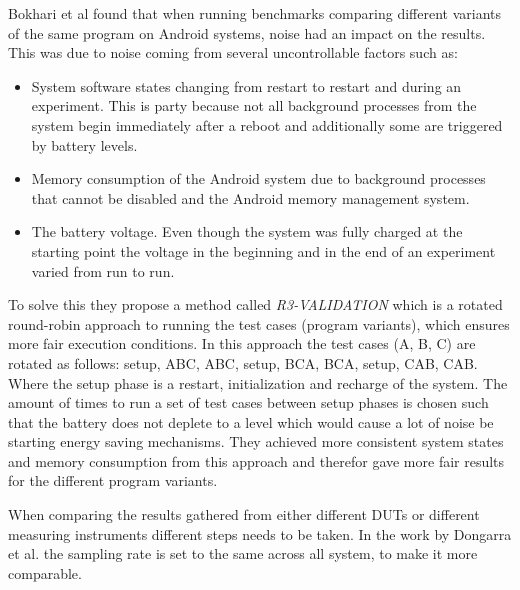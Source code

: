 Bokhari et al\cite{Bokhari2020r3} found that when running benchmarks comparing different variants of the same program on Android systems, noise had an impact on the results. This was due to noise coming from several uncontrollable factors such as:\cite*{Bokhari2020r3}

\begin{itemize}
    \item System software states changing from restart to restart and during an experiment. This is party because not all background processes from the system begin immediately after a reboot and additionally some are triggered by battery levels.
    \item Memory consumption of the Android system due to background processes that cannot be disabled and the Android memory management system.
    \item The battery voltage. Even though the system was fully charged at the starting point the voltage in the beginning and in the end of an experiment varied from run to run.
\end{itemize}

To solve this they propose a method called \textit{R3-VALIDATION}\cite*{Bokhari2020r3} which is a rotated round-robin approach to running the test cases (program variants), which ensures more fair execution conditions. In this approach the test cases (A, B, C) are rotated as follows: setup, ABC, ABC, setup, BCA, BCA, setup, CAB, CAB. Where the setup phase is a restart, initialization and recharge of the system. The amount of times to run a set of test cases between setup phases is chosen such that the battery does not deplete to a level which would cause a lot of noise be starting energy saving mechanisms. They achieved more consistent system states and memory consumption from this approach and therefor gave more fair results for the different program variants.\cite*{Bokhari2020r3}\nytafsnit

When comparing the results gathered from either different DUTs or different measuring instruments different steps needs to be taken. In the work by Dongarra et al.\cite*[]{Dongarra2012} the sampling rate is set to the same across all system, to make it more comparable.